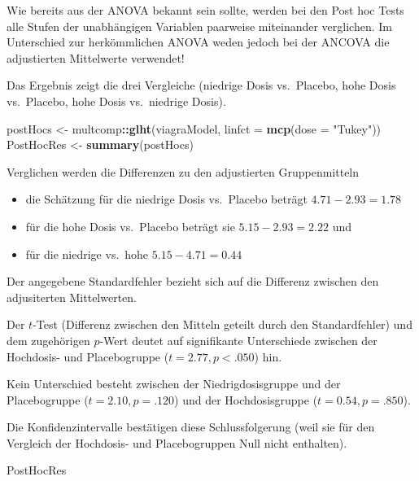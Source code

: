 \documentclass[]{article}
\newenvironment{Shaded}{\begin{snugshade}}{\end{snugshade}}
\newcommand{\DataTypeTok}[1]{\textcolor[rgb]{0.13,0.29,0.53}{#1}}
\newcommand{\KeywordTok}[1]{\textcolor[rgb]{0.13,0.29,0.53}{\textbf{#1}}}
\newcommand{\NormalTok}[1]{#1}
\newcommand{\OperatorTok}[1]{\textcolor[rgb]{0.81,0.36,0.00}{\textbf{#1}}}
\newcommand{\StringTok}[1]{\textcolor[rgb]{0.31,0.60,0.02}{#1}}
\providecommand{\tightlist}{%
  \setlength{\itemsep}{0pt}\setlength{\parskip}{0pt}}
\begin{document}
Wie bereits aus der ANOVA bekannt sein sollte, werden bei den Post hoc Tests alle Stufen der unabhängigen Variablen paarweise miteinander verglichen. Im Unterschied zur herkömmlichen ANOVA weden jedoch bei der ANCOVA die adjustierten Mittelwerte verwendet!

Das Ergebnis zeigt die drei Vergleiche (niedrige Dosis vs.~Placebo, hohe Dosis vs.~Placebo, hohe Dosis vs.~niedrige Dosis).

\begin{Shaded}
\begin{Highlighting}[]
\NormalTok{    postHocs <-}\StringTok{ }\NormalTok{multcomp}\OperatorTok{::}\KeywordTok{glht}\NormalTok{(viagraModel, }\DataTypeTok{linfct =} \KeywordTok{mcp}\NormalTok{(}\DataTypeTok{dose =} \StringTok{"Tukey"}\NormalTok{))}
\NormalTok{    PostHocRes <-}\StringTok{ }\KeywordTok{summary}\NormalTok{(postHocs)}
\end{Highlighting}
\end{Shaded}

Verglichen werden die Differenzen zu den adjustierten Gruppenmitteln

\begin{itemize}
\tightlist
\item
  die Schätzung für die niedrige Dosis vs.~Placebo beträgt \(4.71 - 2.93 = 1.78\)
\item
  für die hohe Dosis vs.~Placebo beträgt sie \(5.15 - 2.93 = 2.22\) und
\item
  für die niedrige vs.~hohe \(5.15 - 4.71 = 0.44\)
\end{itemize}

Der angegebene Standardfehler bezieht sich auf die Differenz zwischen den adjusiterten Mittelwerten.

Der \(t\)-Test (Differenz zwischen den Mitteln geteilt durch den Standardfehler) und dem zugehörigen \(p\)-Wert deutet auf signifikante Unterschiede zwischen der Hochdosis- und Placebogruppe (\(t = 2.77, p < .050\)) hin.

Kein Unterschied besteht zwischen der Niedrigdosisgruppe und der Placebogruppe (\(t = 2.10, p = .120\)) und der Hochdosisgruppe (\(t = 0.54, p = .850\)).

Die Konfidenzintervalle bestätigen diese Schlussfolgerung (weil sie für den Vergleich der Hochdosis- und Placebogruppen Null nicht enthalten).

\begin{Shaded}
\begin{Highlighting}[]
\NormalTok{    PostHocRes}
\end{Highlighting}
\end{Shaded}
\end{document}
